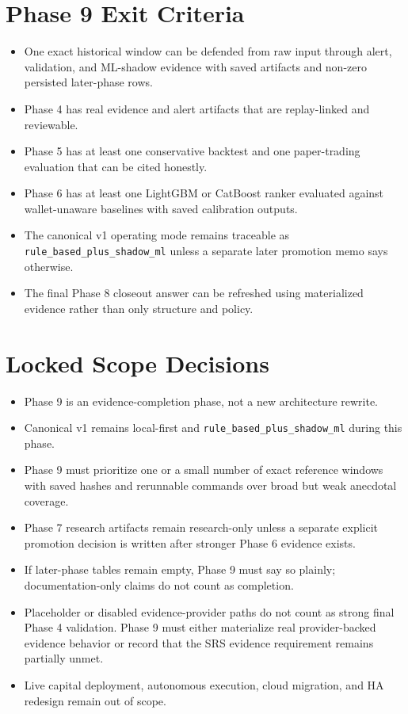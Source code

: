\documentclass{article}
\begin{document}
\section*{Phase 9 Exit Criteria}
\begin{itemize}
\item One exact historical window can be defended from raw input through alert, validation, and ML-shadow evidence with saved artifacts and non-zero persisted later-phase rows.
\item Phase 4 has real evidence and alert artifacts that are replay-linked and reviewable.
\item Phase 5 has at least one conservative backtest and one paper-trading evaluation that can be cited honestly.
\item Phase 6 has at least one LightGBM or CatBoost ranker evaluated against wallet-unaware baselines with saved calibration outputs.
\item The canonical v1 operating mode remains traceable as \texttt{rule\_based\_plus\_shadow\_ml} unless a separate later promotion memo says otherwise.
\item The final Phase 8 closeout answer can be refreshed using materialized evidence rather than only structure and policy.
\end{itemize}

\section*{Locked Scope Decisions}
\begin{itemize}
\item Phase 9 is an evidence-completion phase, not a new architecture rewrite.
\item Canonical v1 remains local-first and \texttt{rule\_based\_plus\_shadow\_ml} during this phase.
\item Phase 9 must prioritize one or a small number of exact reference windows with saved hashes and rerunnable commands over broad but weak anecdotal coverage.
\item Phase 7 research artifacts remain research-only unless a separate explicit promotion decision is written after stronger Phase 6 evidence exists.
\item If later-phase tables remain empty, Phase 9 must say so plainly; documentation-only claims do not count as completion.
\item Placeholder or disabled evidence-provider paths do not count as strong final Phase 4 validation. Phase 9 must either materialize real provider-backed evidence behavior or record that the SRS evidence requirement remains partially unmet.
\item Live capital deployment, autonomous execution, cloud migration, and HA redesign remain out of scope.
\end{itemize}
\end{document}
